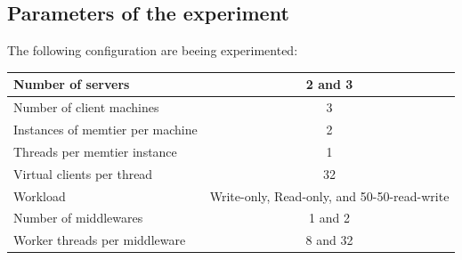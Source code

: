 \documentclass[11pt,a4paper]{article}
\begin{document}
\subsection{Parameters of the experiment}
The following configuration are beeing experimented:
\begin{center}
	\scriptsize{
		\begin{tabular}{|l|c|}
			\hline Number of servers                & 2 and 3                                     \\ 
			\hline Number of client machines        & 3                                           \\ 
			\hline Instances of memtier per machine & 2                                           \\ 
			\hline Threads per memtier instance     & 1                                           \\
			\hline Virtual clients per thread       & 32                                     \\ 
			\hline Workload                         & Write-only, Read-only, and 50-50-read-write \\
			\hline Number of middlewares            & 1 and 2                                     \\
			\hline Worker threads per middleware    & 8 and 32                                    \\
			\hline 
		\end{tabular}
	} 
\end{center}
\end{document}
